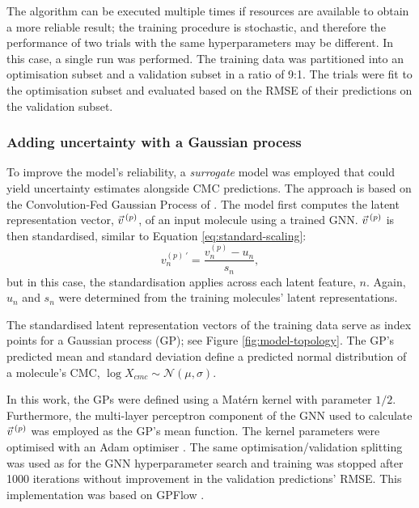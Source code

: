 The algorithm can be executed multiple times if resources are available to obtain a more reliable result; the training procedure is stochastic, and therefore the performance of two trials with the same hyperparameters may be different. In this case, a single run was performed. The training data was partitioned into an optimisation subset and a validation subset in a ratio of 9:1. The trials were fit to the optimisation subset and evaluated based on the RMSE of their predictions on the validation subset.

\subsubsection{Adding uncertainty with a Gaussian process}

To improve the model's reliability, a \emph{surrogate} model was employed that could yield uncertainty estimates alongside CMC predictions. The approach is based on the Convolution-Fed Gaussian Process of \citet{tranMethodsComparingUncertainty2020}. The model first computes the latent representation vector, $\vec{v}^{\,(p)}{}$, of an input molecule using a trained GNN. $\vec{v}^{\,(p)}{}$ is then standardised, similar to Equation \ref{eq:standard-scaling}:
\begin{equation}
    v^{(p)\,\prime}_n = \frac{v^{(p)}_n - u_n}{s_n},
\end{equation}
but in this case, the standardisation applies across each latent feature, $n$.
Again, $u_n$ and $s_n$ were determined from the training molecules' latent representations.

The standardised latent representation vectors of the training data serve as index points for a Gaussian process (GP); see Figure \ref{fig:model-topology}.
The GP's predicted mean and standard deviation define a predicted normal distribution of a molecule's CMC, $\log X_{cmc} \sim \mathcal{N}(\mu, \sigma)$.

In this work, the GPs  were defined using a Mat\'ern kernel with parameter $1/2$. Furthermore, the multi-layer perceptron component of the GNN used to calculate $\vec{v}^{\,(p)}{}$ was employed as the GP's mean function. 
The kernel parameters were optimised with an Adam optimiser \cite{kingmaAdamMethodStochastic2017a}.
The same optimisation/validation splitting was used as for the GNN hyperparameter search and training was stopped after \num{1000} iterations without improvement in the validation predictions' RMSE. This implementation was based on GPFlow \cite{matthewsGPflowGaussianProcess2017}.